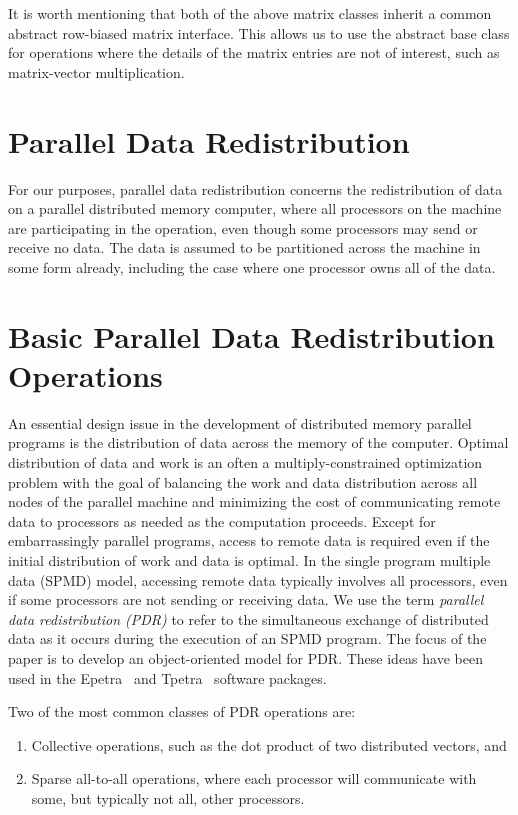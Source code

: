 \documentclass[10pt,relax]{PetraObjectModel}
\begin{document}
It is worth mentioning that both of the above matrix classes inherit
a common abstract row-biased matrix interface.  This allows us to use the
abstract base class for operations where the details of the matrix entries
are not of interest, such as matrix-vector multiplication.



\section{Parallel Data Redistribution}
For our purposes, parallel data redistribution concerns the redistribution of
data on a parallel distributed memory computer, where all processors on the
machine are participating in the operation, even though some processors may
send or receive no data.  The data is assumed to be partitioned across the
machine in some form already, including the case where one processor owns all
of the data.


\section{Basic Parallel Data Redistribution Operations}

An essential design issue in the development of distributed memory parallel programs is the
distribution of data across the memory of the computer.  Optimal distribution of data and work
is an often a multiply-constrained optimization problem with the goal of balancing the work and
data distribution across all nodes of the parallel machine and minimizing the cost of
communicating remote data to processors as needed as the computation proceeds.
Except for embarrassingly parallel programs, access to remote data is required even if
the initial distribution of work and data is optimal.  In the single program multiple data
(SPMD) model, accessing remote data typically involves all processors, even if some processors
are not sending or receiving data.  We use the term {\it parallel data
redistribution (PDR)} to refer to the simultaneous exchange of distributed data as it occurs during
the execution of an SPMD program.  The focus of the paper is to develop an object-oriented
model for PDR.  These ideas have been used in the Epetra~\cite{Epetra-Ref-Manual} and
Tpetra~\cite{Tpetra-User-Guide} software packages.

Two of the most common classes of PDR operations are:
\begin{enumerate}
\item Collective operations, such as the dot
product of two distributed vectors, and
\item Sparse all-to-all operations, where each processor will
communicate with some, but typically not all, other processors.
\end{enumerate}
\end{document}
